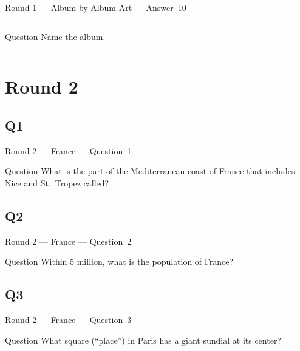 \documentclass[11pt]{beamer}
\begin{document}
\begin{frame}[t]{Round 1 --- Album by Album Art --- \mbox{Answer 10}}
\begin{columns}[T,totalwidth=\linewidth]
\begin{column}{0.32\linewidth}
\begin{block}{Question}
Name the album.
\end{block}
\end{column}
\begin{column}{0.65\linewidth}
\begin{center}
\texttt{[image: \{Images/bookends]}.jpeg}
\end{center}
\end{column}
\end{columns}
\end{frame}
\def\thisSectionName{France}
\section{Round 2}
\subsection*{Q1}
\begin{frame}[t]{Round 2 --- France --- \mbox{Question 1}}
\begin{block}{Question}
What is the part of the Mediterranean coast of France that includes Nice and St.\ Tropez called? 
\end{block}
\end{frame}
\subsection*{Q2}
\begin{frame}[t]{Round 2 --- France --- \mbox{Question 2}}
\begin{block}{Question}
Within 5 million, what is the population of France?
\end{block}
\end{frame}
\subsection*{Q3}
\begin{frame}[t]{Round 2 --- France --- \mbox{Question 3}}
\begin{block}{Question}
What square (``place'') in Paris has a giant sundial at its center?
\end{block}
\end{frame}
\end{document}
